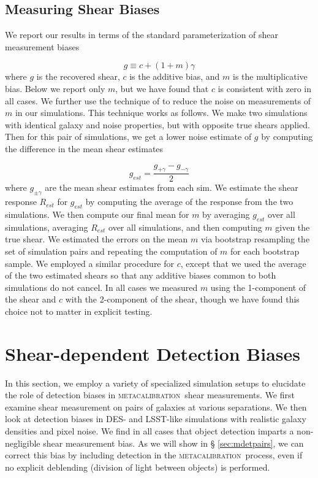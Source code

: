 \documentclass[fleqn,useAMS,usenatbib]{mnras}
\newcommand{\mcal}{\textsc{metacalibration}}
\begin{document}
\subsection{Measuring Shear Biases}

We report our results in terms of the standard parameterization of shear
measurement biases \citep[see, e.g.,][]{heymans2006}

\begin{equation}
g \equiv c + (1 + m)\gamma
\end{equation}
where $g$ is the recovered shear, $c$ is the additive bias, and $m$ is the
multiplicative bias. Below we report only $m$, but we have found that $c$ is
consistent with zero in all cases. We further use the technique of
\citet{pujol2019} to reduce the noise on measurements of $m$ in our simulations.
This technique works as follows. We make two simulations with identical galaxy
and noise properties, but with opposite true shears applied. Then for this pair
of simulations, we get a lower noise estimate of $g$ by computing the difference
in the mean shear estimates

\begin{equation}
g_{est} = \frac{g_{+\gamma} - g_{-\gamma}}{2}
\end{equation}
where $g_{\pm\gamma}$ are the mean shear estimates from each sim. We estimate
the shear response $R_{est}$ for $g_{est}$ by computing the average of the
response from the two simulations. We then  compute our final mean for $m$ by
averaging $g_{est}$ over all simulations, averaging $R_{est}$ over all
simulations, and then computing $m$ given the true shear. We estimated the
errors on the mean $m$ via bootstrap resampling the set of simulation pairs and
repeating the computation of $m$ for each bootstrap sample. We employed a
similar procedure for $c$, except that we used the average of the two estimated
shears so that any additive biases common to both simulations do not cancel. In
all  cases we measured $m$ using the 1-component of the shear and $c$ with the
2-component of the shear, though we have found this choice not to matter in
explicit testing.

\section{Shear-dependent Detection Biases}\label{sec:detbiases}

In this section, we employ a variety of specialized simulation setups to
elucidate the role of detection biases in \mcal\ shear measurements. We first
examine shear measurement on pairs of galaxies at various separations. We then
look at detection biases in DES- and LSST-like simulations with realistic
galaxy densities and pixel noise. We find in all cases that object detection
imparts a non-negligible shear measurement bias. As we will show in \S
\ref{sec:mdetpairs}, we can correct this bias by including detection in the
\mcal\ process, even if no explicit deblending (division of light between
objects) is performed.
\end{document}
